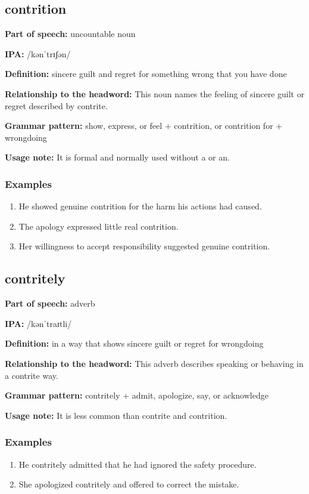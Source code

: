 \documentclass[11pt]{article}
\begin{document}
\subsection{contrition}
\textbf{Part of speech:} uncountable noun

\textbf{IPA:} /kənˈtrɪʃən/

\textbf{Definition:} sincere guilt and regret for something wrong that you have done

\textbf{Relationship to the headword:} This noun names the feeling of sincere guilt or regret described by contrite.

\textbf{Grammar pattern:} show, express, or feel + contrition, or contrition for + wrongdoing

\textbf{Usage note:} It is formal and normally used without a or an.

\subsubsection{Examples}
\begin{enumerate}
  \item He showed genuine contrition for the harm his actions had caused.
  \item The apology expressed little real contrition.
  \item Her willingness to accept responsibility suggested genuine contrition.
\end{enumerate}

\subsection{contritely}
\textbf{Part of speech:} adverb

\textbf{IPA:} /kənˈtraɪtli/

\textbf{Definition:} in a way that shows sincere guilt or regret for wrongdoing

\textbf{Relationship to the headword:} This adverb describes speaking or behaving in a contrite way.

\textbf{Grammar pattern:} contritely + admit, apologize, say, or acknowledge

\textbf{Usage note:} It is less common than contrite and contrition.

\subsubsection{Examples}
\begin{enumerate}
  \item He contritely admitted that he had ignored the safety procedure.
  \item She apologized contritely and offered to correct the mistake.
\end{enumerate}
\end{document}
